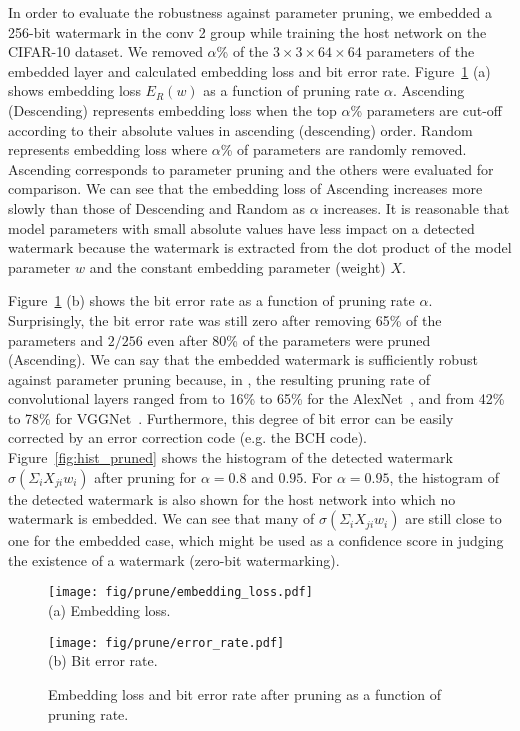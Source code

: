 \documentclass[10pt,twocolumn,letterpaper]{article}
\begin{document}
In order to evaluate the robustness against parameter pruning, we embedded a 256-bit watermark in the \textsf{conv 2} group while training the host network on the CIFAR-10 dataset.
We removed $\alpha$\% of the $3 \times 3 \times 64 \times 64$ parameters of the embedded layer and calculated embedding loss and bit error rate.
Figure~\ref{fig:prune} (a) shows embedding loss $E_R (w)$ as a function of pruning rate $\alpha$.
\textsf{Ascending} (\textsf{Descending}) represents embedding loss when the top $\alpha$\% parameters are cut-off according to their absolute values in ascending (descending) order.
\textsf{Random} represents embedding loss where $\alpha$\% of parameters are randomly removed.
\textsf{Ascending} corresponds to parameter pruning and the others were evaluated for comparison.
We can see that the embedding loss of \textsf{Ascending} increases more slowly than those of \textsf{Descending} and \textsf{Random} as $\alpha$ increases.
It is reasonable that model parameters with small absolute values have less impact on a detected watermark because the watermark is extracted from the dot product of the model parameter $w$ and the constant embedding parameter (weight) $X$.

Figure~\ref{fig:prune} (b) shows the bit error rate as a function of pruning rate $\alpha$.
Surprisingly, the bit error rate was still zero after removing 65\% of the parameters and $2/256$ even after 80\% of the parameters were pruned (\textsf{Ascending}).
We can say that the embedded watermark is sufficiently robust against parameter pruning because, in \cite{han_iclr16}, the resulting pruning rate of convolutional layers ranged from to 16\% to 65\% for the AlexNet~\cite{kri_nips12}, and from 42\% to 78\% for VGGNet~\cite{Simonyan_iclr15}.
Furthermore, this degree of bit error can be easily corrected by an error correction code (e.g. the BCH code).
Figure~\ref{fig:hist_pruned} shows the histogram of the detected watermark $\sigma(\Sigma_{i} X_{ji} w_i)$ after pruning for $\alpha = 0.8$ and $0.95$.
For $\alpha = 0.95$, the histogram of the detected watermark is also shown for the host network into which no watermark is embedded.
We can see that many of $\sigma(\Sigma_{i} X_{ji} w_i)$ are still close to one for the embedded case, which might be used as a confidence score in judging the existence of a watermark (zero-bit watermarking).


\begin{figure}[tb]
	\centering
	\begin{minipage}[b]{\linewidth}
		\texttt{[image: fig/prune/embedding\_loss.pdf]} \\
	\centering (a) Embedding loss.
	\end{minipage}
	\begin{minipage}[b]{\linewidth}
		\texttt{[image: fig/prune/error\_rate.pdf]} \\
	\centering (b) Bit error rate.
	\end{minipage}
	\caption{Embedding loss and bit error rate after pruning as a function of pruning rate.}
	\label{fig:prune}
\end{figure}
\end{document}
